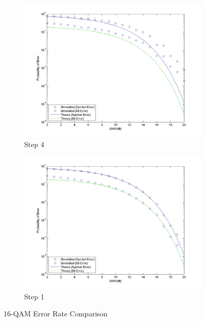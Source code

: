 \documentclass[]{article}
\begin{document}
\newpage

\begin{figure}[h]
        \centering
        \begin{subfigure}[b]{0.6\textwidth}
                \includegraphics[width=\textwidth]{qam16SNR.jpg}
                \caption{Step 4}
                \label{fig:qam16SNR}
        \end{subfigure}%
        \qquad \quad %
        \begin{subfigure}[b]{0.6\textwidth}
                \includegraphics[width=\textwidth]{qam16SNRstep1.jpg}
                \caption{Step 1}
                \label{fig:qam16SNR1}
        \end{subfigure}
        \caption{16-QAM Error Rate Comparison }
\end{figure}
\end{document}
